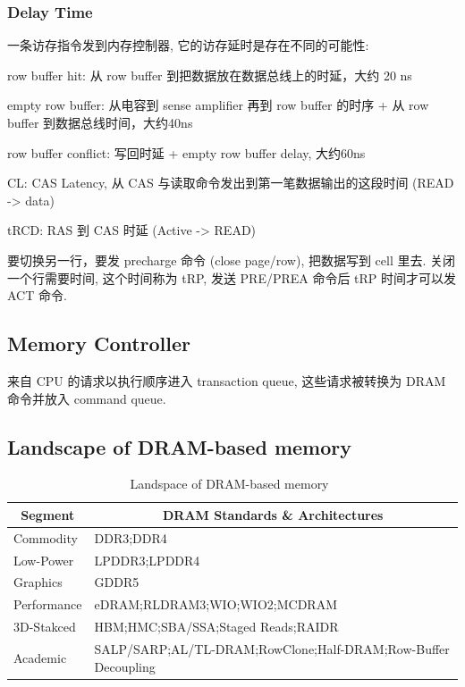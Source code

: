 \documentclass[UTF8,12pt,a4paper]{article}
\begin{document}
\subsubsection{Delay Time}
一条访存指令发到内存控制器, 它的访存延时是存在不同的可能性:
\begin{compactitem}
  \item row buffer hit: 从 row buffer 到把数据放在数据总线上的时延，大约 20 ns
  \item empty row buffer: 从电容到 sense amplifier 再到 row buffer 的时序 + 从 row buffer 到数据总线时间，大约40ns
  \item row buffer conflict: 写回时延 + empty row buffer delay, 大约60ns
  \item CL: CAS Latency, 从 CAS 与读取命令发出到第一笔数据输出的这段时间 (READ -> data)
  \item tRCD: RAS 到 CAS 时延 (Active -> READ)
  \item 要切换另一行，要发 precharge 命令 (close page/row), 把数据写到 cell 里去.
  关闭一个行需要时间, 这个时间称为 tRP, 发送 PRE/PREA 命令后 tRP 时间才可以发 ACT 命令.
\end{compactitem}

\subsection{Memory Controller}
来自 CPU 的请求以执行顺序进入 transaction queue,
这些请求被转换为 DRAM 命令并放入 command queue.

\subsection{Landscape of DRAM-based memory}
\begin{table}
  \begin{small}
    \caption{Landspace of DRAM-based memory~\cite{DBLP:journals/cal/KimYM16}}
    \label{tab:memory_landscape}
    \begin{center}
      \begin{tabular}[c]{l|l}
        \hline
        \multicolumn{1}{c|}{\textbf{Segment}} & 
        \multicolumn{1}{c}{\textbf{DRAM Standards \& Architectures}} \\
        \hline
        Commodity & DDR3;DDR4 \\
        Low-Power & LPDDR3;LPDDR4 \\
        Graphics & GDDR5 \\
        Performance & eDRAM;RLDRAM3;WIO;WIO2;MCDRAM \\
        3D-Stakced & HBM;HMC;SBA/SSA;Staged Reads;RAIDR \\
        Academic & SALP/SARP;AL/TL-DRAM;RowClone;Half-DRAM;Row-Buffer Decoupling \\
        \hline
      \end{tabular}
    \end{center}
  \end{small}
\end{table}
\end{document}
